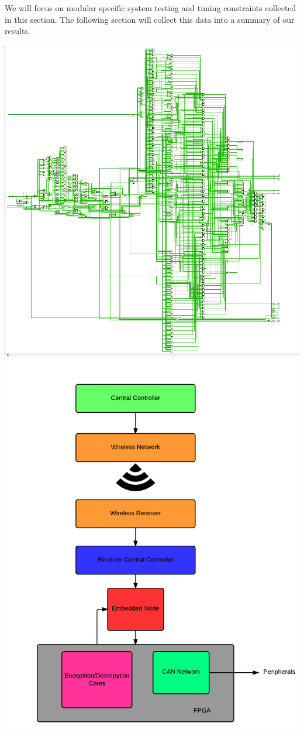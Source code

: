 \documentclass[a0,landscape]{a0poster}
\begin{document}
\begin{multicols}{3}
We will focus on modular specific system testing and timing constraints collected in this section. The following section will collect this data into a summary of our results.

\begin{vwcol}[widths={0.4,0.6}]
\includegraphics[scale=0.5]{fpga_synth1}
\hspace{5em}\includegraphics[scale=1.1]{design_flow}

\end{vwcol}
\end{multicols}
\end{document}

